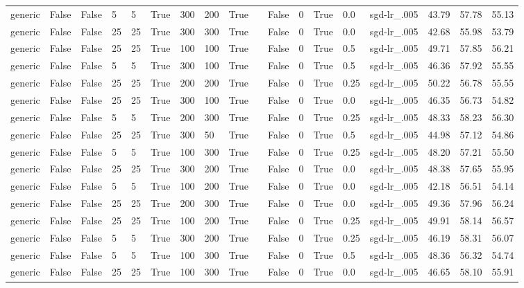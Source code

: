 \begin{adjustbox}{rotate=90,height=\textheight,width=\textwidth}
\begin{tabular}{llllllllllllllllll}
generic & False & False & 5 & 5 & True & 300 & 200 & True &  & False & 0 & True & 0.0 & sgd-lr\_.005 & 43.79 & 57.78 & 55.13\\
generic & False & False & 25 & 25 & True & 300 & 300 & True &  & False & 0 & True & 0.0 & sgd-lr\_.005 & 42.68 & 55.98 & 53.79\\
generic & False & False & 25 & 25 & True & 100 & 100 & True &  & False & 0 & True & 0.5 & sgd-lr\_.005 & 49.71 & 57.85 & 56.21\\
generic & False & False & 5 & 5 & True & 300 & 100 & True &  & False & 0 & True & 0.5 & sgd-lr\_.005 & 46.36 & 57.92 & 55.55\\
generic & False & False & 25 & 25 & True & 200 & 200 & True &  & False & 0 & True & 0.25 & sgd-lr\_.005 & 50.22 & 56.78 & 55.55\\
generic & False & False & 25 & 25 & True & 300 & 100 & True &  & False & 0 & True & 0.0 & sgd-lr\_.005 & 46.35 & 56.73 & 54.82\\
generic & False & False & 5 & 5 & True & 200 & 300 & True &  & False & 0 & True & 0.25 & sgd-lr\_.005 & 48.33 & 58.23 & 56.30\\
generic & False & False & 25 & 25 & True & 300 & 50 & True &  & False & 0 & True & 0.5 & sgd-lr\_.005 & 44.98 & 57.12 & 54.86\\
generic & False & False & 5 & 5 & True & 100 & 300 & True &  & False & 0 & True & 0.25 & sgd-lr\_.005 & 48.20 & 57.21 & 55.50\\
generic & False & False & 25 & 25 & True & 300 & 200 & True &  & False & 0 & True & 0.0 & sgd-lr\_.005 & 48.38 & 57.65 & 55.95\\
generic & False & False & 5 & 5 & True & 100 & 200 & True &  & False & 0 & True & 0.0 & sgd-lr\_.005 & 42.18 & 56.51 & 54.14\\
generic & False & False & 25 & 25 & True & 200 & 300 & True &  & False & 0 & True & 0.0 & sgd-lr\_.005 & 49.36 & 57.96 & 56.24\\
generic & False & False & 25 & 25 & True & 100 & 200 & True &  & False & 0 & True & 0.25 & sgd-lr\_.005 & 49.91 & 58.14 & 56.57\\
generic & False & False & 5 & 5 & True & 300 & 200 & True &  & False & 0 & True & 0.25 & sgd-lr\_.005 & 46.19 & 58.31 & 56.07\\
generic & False & False & 5 & 5 & True & 100 & 300 & True &  & False & 0 & True & 0.5 & sgd-lr\_.005 & 48.36 & 56.32 & 54.74\\
generic & False & False & 25 & 25 & True & 100 & 300 & True &  & False & 0 & True & 0.0 & sgd-lr\_.005 & 46.65 & 58.10 & 55.91\\

\end{tabular}
\end{adjustbox}
